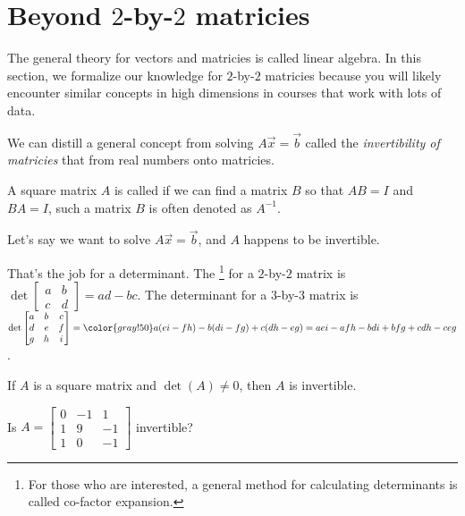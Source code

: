 \documentclass[../main.tex]{subfiles}
\begin{document}
 \section{Beyond \texorpdfstring{\(2\)-by-\(2\)}{2-by-2} matricies}

The general theory for vectors and matricies is called linear algebra. In this section, we formalize our knowledge for \(2\)-by-\(2\) matricies because you will likely encounter similar concepts in high dimensions in courses that work with lots of data. 

We can distill a general concept from solving \(A \vec{x} = \vec{b}\) called the \emph{invertibility of matricies} that  from real numbers onto matricies.

\faStar{} A square matrix \(A\) is called  if we can find a matrix \(B\) so that \(AB = I\) and \(BA = I\), such a matrix \(B\) is often denoted as \(A^{-1}\). 

  Let's say we want to solve \(A \vec{x} = \vec{b}\), and \(A\) happens to be invertible. 

 That's the job for a determinant. The \footnote{For those who are interested, a general method for calculating determinants is called co-factor expansion.} for a \(2\)-by-\(2\) matrix is \(\det \begin{bmatrix} a & b \\ c & d \end{bmatrix} = ad - bc\).  The determinant for a \(3\)-by-\(3\) matrix is \(\det \begin{bmatrix} a & b & c \\ d & e & f \\ g & h & i\end{bmatrix} = {\color{gray!50} a (ei - fh) - b (di - fg) + c (dh - eg)} = aei - afh - bdi + bfg + cdh - ceg \). 

\faStar{} If \(A\) is a square matrix and \(\det(A) \ne 0\), then \(A\) is invertible. 

\begin{example}
  Is \(A = \begin{bmatrix} 0 & -1 & 1 \\ 1 & 9 & -1 \\ 1 & 0 & -1\end{bmatrix}\) invertible?
\end{example}
\clearpage
\end{document}
